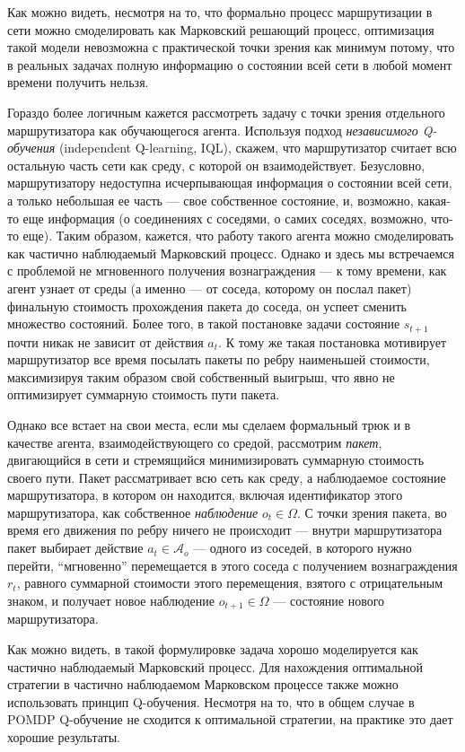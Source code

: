 \documentclass[specification, annotation]{itmo-student-thesis}
\begin{document}
Как можно видеть, несмотря на то, что формально процесс маршрутизации в сети
можно смоделировать как Марковский решающий процесс, оптимизация такой модели
невозможна с практической точки зрения как минимум потому, что в реальных
задачах полную информацию о состоянии всей сети в любой момент времени получить
нельзя.

Гораздо более логичным кажется рассмотреть задачу с точки зрения отдельного
маршрутизатора как обучающегося агента. Используя подход \textit{независимого
  Q-обучения} (independent Q-learning, IQL)\cite{tan1993multi}, скажем, что
маршрутизатор считает всю остальную часть сети как среду, с которой он
взаимодействует. Безусловно, маршрутизатору недоступна исчерпывающая информация
о состоянии всей сети, а только небольшая ее часть --- свое собственное
состояние, и, возможно, какая-то еще информация (о соединениях с соседями, о
самих соседях, возможно, что-то еще). Таким образом, кажется, что работу такого
агента можно смоделировать как частично наблюдаемый Марковский процесс. Однако и
здесь мы встречаемся с проблемой не мгновенного получения вознаграждения --- к
тому времени, как агент узнает от среды (а именно --- от соседа, которому он
послал пакет) финальную стоимость прохождения пакета до соседа, он успеет
сменить множество состояний. Более того, в такой постановке задачи состояние
$s_{t+1}$ почти никак не зависит от действия $a_t$. К тому же такая постановка
мотивирует маршрутизатор все время посылать пакеты по ребру наименьшей
стоимости, максимизируя таким образом свой собственный выигрыш, что явно не
оптимизирует суммарную стоимость пути пакета.

Однако все встает на свои места, если мы сделаем формальный трюк и в качестве
агента, взаимодействующего со средой, рассмотрим \textit{пакет}, двигающийся в
сети и стремящийся минимизировать суммарную стоимость своего пути. Пакет
рассматривает всю сеть как среду, а наблюдаемое состояние маршрутизатора, в
котором он находится, включая идентификатор этого маршрутизатора, как
собственное \textit{наблюдение}  $o_t \in \Omega$. С точки зрения пакета, во время
его движения по ребру ничего не происходит --- внутри маршрутизатора пакет
выбирает действие $a_t \in \mathcal{A}_o$ --- одного из соседей, в которого нужно
перейти, ``мгновенно'' перемещается в этого соседа с получением вознаграждения $r_t$,
равного суммарной стоимости этого перемещения, взятого с отрицательным знаком, и
получает новое наблюдение $o_{t+1} \in \Omega$ --- состояние нового маршрутизатора.

Как можно видеть, в такой формулировке задача хорошо моделируется как частично
наблюдаемый Марковский процесс. Для нахождения оптимальной стратегии в частично
наблюдаемом Марковском процессе также можно использовать принцип Q-обучения.
Несмотря на то, что в общем случае в POMDP Q-обучение не сходится к оптимальной
стратегии, на практике это дает хорошие результаты.
\end{document}
